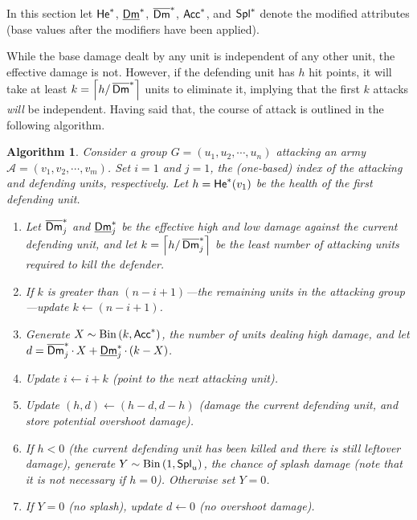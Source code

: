 \documentclass{article}
\newcommand{\ceil}[1]{\left\lceil #1 \right\rceil}
\newcommand{\overwr}{\leftarrow}
\newcommand{\cA}{\mathcal{A}}
\DeclareMathOperator{\He}{{\sf He}} %
\DeclareMathOperator{\DLow}{\underline{\sf Dm}} %
\DeclareMathOperator{\DHigh}{\overline{\sf Dm}} %
\DeclareMathOperator{\Acc}{{\sf Acc}} %
\DeclareMathOperator{\Spl}{{\sf Spl}} %
\newtheorem{algorithm}{Algorithm}
\numberwithin{equation}{section}
\begin{document}
In this section let $\He ^*$, $\DLow ^*$, $\DHigh ^*$, $\Acc ^*$, and $\Spl ^*$ denote the modified attributes (base values after the modifiers have been applied).

While the base damage dealt by any unit is independent of any other unit, the effective damage is not. 
However, if the defending unit has $h$ hit points, it will take at least $k = \ceil{h / \DHigh ^*}$ units to eliminate it, implying that the first $k$ attacks \emph{will} be independent.
%
Having said that, the course of attack is outlined in the following algorithm.
\begin{algorithm}
    Consider a group $G = (u_1, u_2, \cdots , u_n)$ attacking an army $\cA = (v_1, v_2, \cdots , v_m)$.
    Set $i = 1$ and $j = 1$, the (one-based) index of the attacking and defending units, respectively. Let $h = \He ^* (v_1)$ be the health of the first defending unit.
    \begin{enumerate}
        \item \label{step:first_conservative} Let $\DHigh _j ^*$ and $\DLow _j ^*$ be the effective high and low damage against the current defending unit, and let $k = \ceil{h / \DHigh _j ^*}$ be the least number of attacking units required to kill the defender.

        \item If $k$ is greater than $(n - i + 1)$---the remaining units in the attacking group---update $k \overwr (n - i + 1)$.

        \item Generate $X \sim \mathrm{Bin} \left(k, \Acc ^* \right)$, the number of units dealing high damage, and let $d = \DHigh _j ^* \cdot \, X + \DLow _j ^* \cdot \, (k - X)$.

        \item Update $i \overwr i + k$ (point to the next attacking unit).

        \item Update $(h, d) \overwr (h - d, d - h)$ (damage the current defending unit, and store potential overshoot damage).

        \item If $h < 0$ (the current defending unit has been killed and there is still leftover damage), generate $Y \sim \mathrm{Bin} \left(1, \Spl _u \right)$, the chance of splash damage (note that it is not necessary if $h = 0$). Otherwise set $Y = 0$.
            
        \item If $Y = 0$ (no splash), update $d \overwr 0$ (no overshoot damage).


\end{enumerate}
\end{algorithm}
\end{document}
